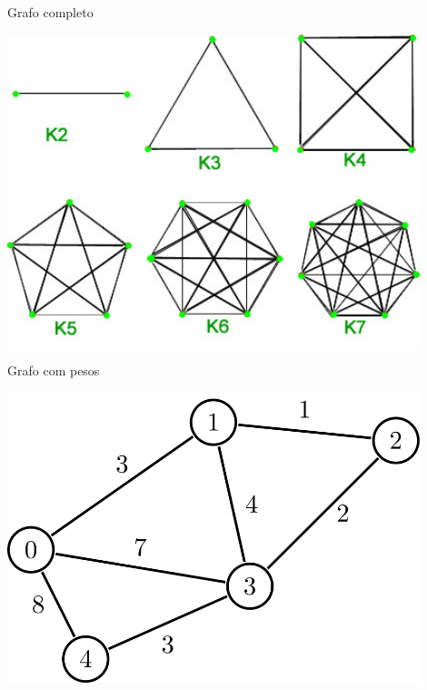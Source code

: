 \documentclass[compress,mathserif]{beamer}
\begin{document}
\begin{frame}{Grafo completo}

\vspace{1cm}

\centering \includegraphics[width=0.9\textwidth]{images/completo.jpg}

\end{frame}


\begin{frame}{Grafo com pesos}

\vspace{1cm}

\centering \includegraphics[width=0.9\textwidth]{images/pesos.png}

\end{frame}

\end{document}
